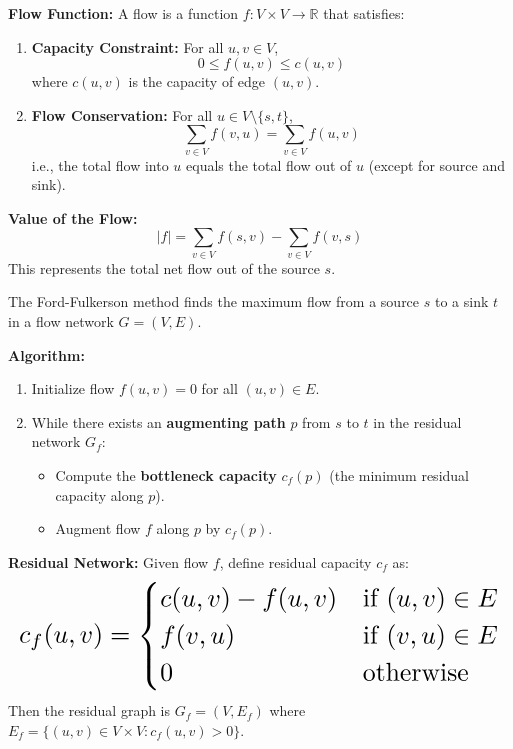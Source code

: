 \documentclass[a4paper,landscape]{article}
\begin{document}
\begin{multicols}{7}
\textbf{Flow Function:} A flow is a function $f : V \times V \to \mathbb{R}$ that satisfies:

\begin{enumerate}[noitemsep, topsep=0pt]
    \item \textbf{Capacity Constraint:} For all $u, v \in V$,
    \[
    0 \leq f(u, v) \leq c(u, v)
    \]
    where $c(u, v)$ is the capacity of edge $(u, v)$.
    
    \item \textbf{Flow Conservation:} For all $u \in V \setminus \{s, t\}$,
    \[
    \sum_{v \in V} f(v, u) = \sum_{v \in V} f(u, v)
    \]
    i.e., the total flow into $u$ equals the total flow out of $u$ (except for source and sink).
\end{enumerate}

\textbf{Value of the Flow:}
\[
|f| = \sum_{v \in V} f(s, v) - \sum_{v \in V} f(v, s)
\]
This represents the total net flow out of the source $s$.
\endtcolorbox

\tcolorbox[mybox={Ford-Fulkerson Method (1954)}]
The Ford-Fulkerson method finds the maximum flow from a source $s$ to a sink $t$ in a flow network $G = (V, E)$.

\textbf{Algorithm:}
\begin{enumerate}[noitemsep, topsep=0pt]
    \item Initialize flow $f(u, v) = 0$ for all $(u, v) \in E$.
    \item While there exists an \textbf{augmenting path} $p$ from $s$ to $t$ in the residual network $G_f$:
    \begin{itemize}
        \item Compute the \textbf{bottleneck capacity} $c_f(p)$ (the minimum residual capacity along $p$).
        \item Augment flow $f$ along $p$ by $c_f(p)$.
    \end{itemize}
\end{enumerate}

\textbf{Residual Network:} Given flow $f$, define residual capacity $c_f$ as:
\[
\resizebox{\textwidth}{!}{$
c_f(u, v) =
\begin{cases}
    c(u, v) - f(u, v) & \text{if } (u, v) \in E \\
    f(v, u) & \text{if } (v, u) \in E \\
    0 & \text{otherwise}
\end{cases}
$}
\]
Then the residual graph is $G_f = (V, E_f)$ where $E_f = \{(u, v) \in V \times V : c_f(u, v) > 0\}$.


\end{multicols}
\end{document}
